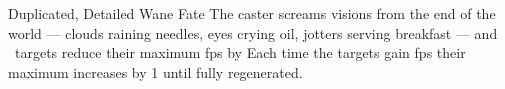   {Duplicated, Detailed}%
  {Wane}%
  {Fate}%
  {}%
  {The caster screams visions from the end of the world --- clouds raining needles, eyes crying oil, \glspl{jotter} serving breakfast --- and ~targets reduce their maximum \glspl{fp} by }%
  {
  Each time the targets gain \glspl{fp} their maximum increases by 1 until fully regenerated.}
